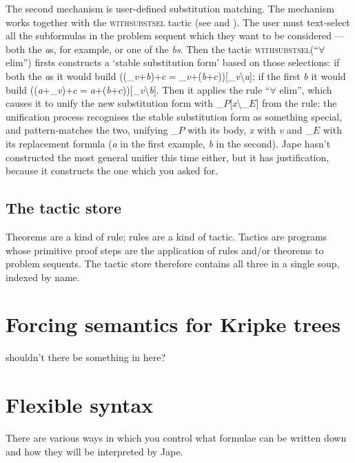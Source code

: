 The second mechanism is user-defined substitution matching. The mechanism works together with the \textsc{withsubstsel} tactic (see  and ). The user must text-select all the subformulas in the problem sequent which they want to be considered --- both the \textit{a}s, for example, or one of the \textit{bs}. Then the tactic \textsc{withsubstsel}(``\ensuremath{\forall} elim'') firsts constructs a `stable substitution form' based on those selections: if both the \textit{a}s it would build ((\_\textit{v}+\textit{b})+$c$\ensuremath{=}\_\textit{v}+(\textit{b}+$c$))[\_\textit{v}{\textbackslash}\textit{a}]; if the first \textit{b} it would build ((\textit{a}+\_\textit{v})+$c$\ensuremath{=}\textit{a}+(\textit{b}+$c$))[\_\textit{v}{\textbackslash}\textit{b}]. Then it applies the rule ``\ensuremath{\forall} elim'', which causes it to unify the new substitution form with \_$P$[\textit{x}{\textbackslash}\_$E$] from the rule: the unification process recognises the stable substitution form as something special, and pattern-matches the two, unifying \_$P$ with its body, \textit{x} with \textit{v} and \_$E$ with its replacement formula (\textit{a} in the first example, \textit{b} in the second). Jape hasn't constructed the most general unifier this time either, but it has justification, because it constructs the one which you asked for.

\subsection{The tactic store}

Theorems are a kind of rule; rules are a kind of tactic. Tactics are programs whose primitive proof steps are the application of rules and/or theorems to problem sequents. The tactic store therefore contains all three in a single soup, indexed by name.

\section{Forcing semantics for Kripke trees}

shouldn't there be something in here?

\section{Flexible syntax}
\label{sec:paraformlang:flexisyntax}

There are various ways in which you control what formulae can be written down and how they will be interpreted by Jape.

